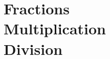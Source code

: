 \chapter{\mbox{\hspace*{-10mm}Fractions}\\ \mbox{\hspace*{-10mm}Multiplication}\\ \mbox{\hspace*{-10mm}Division}} %



\makeatletter
    \renewcommand{\smc@chaptertitle}{\parbox{3cm}{\small Fractions \par Multiplication/Division}}
\makeatother
\activites


\cours


\exercicesbase


% 

\Recreation


% 

% 

% 

%
% 